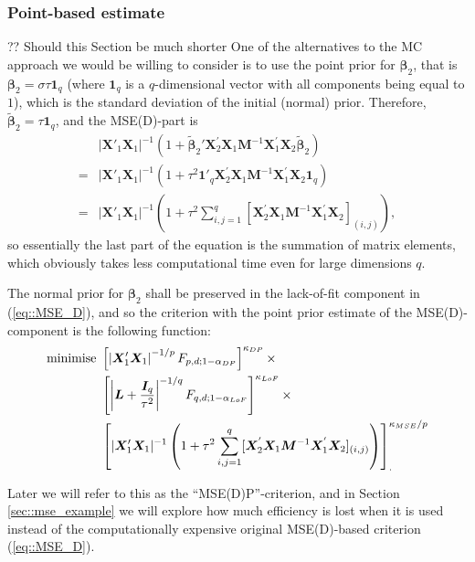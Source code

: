 \subsubsection{Point-based estimate}
?? Should this Section be much shorter
One of the alternatives to the MC approach we would be willing to consider is to use the point prior for $\bm{\beta}_2$, that is $\bm{\beta}_2=\sigma\tau\bm{1}_q$ (where $\bm{1}_q$ is a $q$-dimensional vector with all components being equal to $1$), which is the standard deviation  of the initial (normal) prior. Therefore, $\bm{\tilde{\beta}}_2=\tau\bm{1}_q$, and the MSE(D)-part is
\begin{align*}
&|\bm{X}'_{1}\bm{X}_{1}|^{-1}(1+\bm{\tilde{\beta}}_{2}'\bm{X}_2^{'}\bm{X}_1\bm{M}^{-1}\bm{X}_1^{'}\bm{X}_2\bm{\tilde{\beta}}_{2})\\=&|\bm{X}'_{1}\bm{X}_{1}|^{-1}(1+\tau^2\bm{1}'_q\bm{X}_2^{'}\bm{X}_1\bm{M}^{-1}\bm{X}_1^{'}\bm{X}_2\bm{1}_q)\\=&|\bm{X}'_{1}\bm{X}_{1}|^{-1}\left(1+\tau^2\sum_{i,j=1}^{q}[\bm{X}_2^{'}\bm{X}_1\bm{M}^{-1}\bm{X}_1^{'}\bm{X}_2]_{(i,j)}\right),
\end{align*}
so essentially the last part of the equation is the summation of matrix elements, which obviously takes less computational time even for large dimensions $q$. 

The normal prior for $\bm{\beta}_2$ shall be preserved in the lack-of-fit component in (\ref{eq::MSE_D}), and so the criterion with the point prior estimate of the MSE(D)-component is the following function:
\begin{align}
\label{eq::MSE_D_point}
\mbox{minimise }&\left[\left|\bm{X}'_{1}\bm{X}_{1}\right|^{-1/p}F_{p,d;1-\alpha_{DP}}\right]^{\kappa_{DP}} \times \notag \\ &\left[\left|\bm{L}+\frac{\bm{I}_{q}}{\tau^{2}}\right|^{-1/q}F_{q,d;1-\alpha_{LoF}}\right]^{\kappa_{LoF}}\times \notag\\ & \left[|\bm{X}'_{1}\bm{X}_{1}|^{-1}\left(1+\tau^2\sum_{i,j=1}^{q}[\bm{X}_2^{'}\bm{X}_1\bm{M}^{-1}\bm{X}_1^{'}\bm{X}_2]_{(i,j)}\right)\right]_{.}^{\kappa_{MSE}/p}
\end{align}

Later we will refer to this as the ``MSE(D)P''-criterion, and in Section \ref{sec::mse_example} we will explore how much efficiency is lost when it is used instead of the computationally expensive original MSE(D)-based criterion (\ref{eq::MSE_D}).

